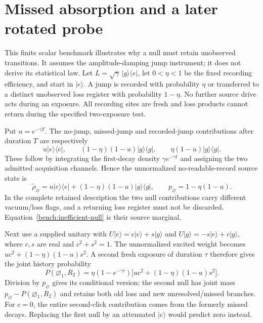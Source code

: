 \documentclass[11pt,oneside,openany]{book}
\theoremstyle{definition}
\theoremstyle{remark}\newtheorem{remark}[theorem]{Remark}
\begin{document}
\section{Missed absorption and a later rotated probe}
\label{bench:inefficient}

This finite scalar benchmark \cite{C01} illustrates why a null must retain
unobserved transitions. It assumes the amplitude-damping jump instrument;
it does not derive its statistical law. Let
$L=\sqrt\gamma\,|g\rangle\langle e|$, let $0<\eta<1$ be the fixed
recording efficiency, and start in $|e\rangle$. A jump is recorded with
probability $\eta$ or transferred to a distinct unobserved loss register
with probability $1-\eta$. No further source drive acts during an exposure.
All recording sites are fresh and loss products cannot return during the
specified two-exposure test.

Put $u=e^{-\gamma T}$. The no-jump, missed-jump and recorded-jump
contributions after duration $T$ are respectively
\[
 u|e\rangle\langle e|,\qquad
 (1-\eta)(1-u)|g\rangle\langle g|,\qquad
 \eta(1-u)|g\rangle\langle g|.
\]
These follow by integrating the first-decay density $\gamma e^{-\gamma t}$
and assigning the two admitted acquisition channels. Hence the
unnormalized no-readable-record source state is
\begin{equation}
 \widetilde\rho_{\varnothing}
 =u|e\rangle\langle e|+(1-\eta)(1-u)|g\rangle\langle g|,
 \qquad p_{\varnothing}=1-\eta(1-u).
 \label{bench:inefficient-null}
\end{equation}
In the complete retained description the two null contributions carry
different vacuum/loss flags, and a returning loss register must not be
discarded. Equation~\eqref{bench:inefficient-null} is their source marginal.

Next use a supplied unitary with
$U|e\rangle=c|e\rangle+s|g\rangle$ and
$U|g\rangle=-s|e\rangle+c|g\rangle$, where $c,s$ are real and
$c^2+s^2=1$. The unnormalized excited weight becomes
$uc^2+(1-\eta)(1-u)s^2$. A second fresh exposure of duration $\tau$
therefore gives the joint history probability
\begin{equation}
 P(\varnothing_1,R_2)=\eta(1-e^{-\gamma\tau})
 \bigl[uc^2+(1-\eta)(1-u)s^2\bigr].
 \label{bench:inefficient-second}
\end{equation}
Division by $p_{\varnothing}$ gives its conditional version; the second
null has joint mass $p_{\varnothing}-P(\varnothing_1,R_2)$ and retains
both old loss and new unresolved/missed branches. For $c=0$, the entire
second-click contribution comes from the formerly missed decays. Replacing
the first null by an attenuated $|e\rangle$ would predict zero instead.
\end{document}

